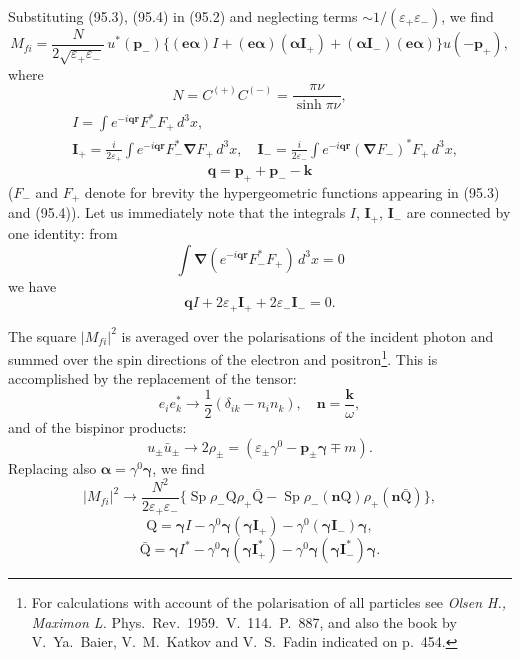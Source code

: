 Substituting (95.3), (95.4) in (95.2) and neglecting terms $\sim 1/(\varepsilon_+\varepsilon_-)$, we find
\begin{equation}
M_{fi} = \frac{N}{2\sqrt{\varepsilon_+\varepsilon_-}}\,u^*(\mathbf{p}_-)\{(\mathbf{e}\boldsymbol{\alpha})I + (\mathbf{e}\boldsymbol{\alpha})(\boldsymbol{\alpha}\mathbf{I}_+) + (\boldsymbol{\alpha}\mathbf{I}_-)(\mathbf{e}\boldsymbol{\alpha})\}u(-\mathbf{p}_+),
\label{eq:95.5}
\end{equation}
where
\begin{equation}
N = C^{(+)}C^{(-)} = \frac{\pi\nu}{\sinh\pi\nu},
\label{eq:95.6}
\end{equation}
\begin{equation}
\begin{split}
&I = \int e^{-i\mathbf{q}\mathbf{r}}F_-^* F_+\,d^3x, \\
&\mathbf{I}_+ = \frac{i}{2\varepsilon_+}\int e^{-i\mathbf{q}\mathbf{r}}F_-^*\boldsymbol{\nabla}F_+\,d^3x, \quad \mathbf{I}_- = \frac{i}{2\varepsilon_-}\int e^{-i\mathbf{q}\mathbf{r}}(\boldsymbol{\nabla}F_-)^*F_+\,d^3x,
\end{split}
\label{eq:95.7}
\end{equation}
\[
\mathbf{q} = \mathbf{p}_+ + \mathbf{p}_- - \mathbf{k}
\]
($F_-$ and $F_+$ denote for brevity the hypergeometric functions appearing in (95.3) and (95.4)). Let us immediately note that the integrals $I$, $\mathbf{I}_+$, $\mathbf{I}_-$ are connected by one identity: from
\[
\int\boldsymbol{\nabla}(e^{-i\mathbf{q}\mathbf{r}}F_-^*F_+)\,d^3x = 0
\]
we have
\begin{equation}
\mathbf{q}I + 2\varepsilon_+\mathbf{I}_+ + 2\varepsilon_-\mathbf{I}_- = 0.
\label{eq:95.8}
\end{equation}

The square $|M_{fi}|^2$ is averaged over the polarisations of the incident photon and summed over the spin directions of the electron and positron\footnote{For calculations with account of the polarisation of all particles see \emph{Olsen H., Maximon L.}\/\/ Phys.\ Rev.\ 1959.\ V.~114.\ P.~887, and also the book by V.~Ya.~Baier, V.~M.~Katkov and V.~S.~Fadin indicated on p.~454.}. This is accomplished by the replacement of the tensor:
\[
e_i e_k^* \to \frac{1}{2}(\delta_{ik} - n_i n_k), \quad \mathbf{n} = \frac{\mathbf{k}}{\omega},
\]
and of the bispinor products:
\[
u_\pm\bar{u}_\pm \to 2\rho_\pm = (\varepsilon_\pm\gamma^0 - \mathbf{p}_\pm\boldsymbol{\gamma} \mp m).
\]
Replacing also $\boldsymbol{\alpha} = \gamma^0\boldsymbol{\gamma}$, we find
\[
|M_{fi}|^2 \to \frac{N^2}{2\varepsilon_+\varepsilon_-}\{\operatorname{Sp}\rho_-\mathrm{Q}\rho_+\bar{\mathrm{Q}} - \operatorname{Sp}\rho_-(\mathbf{n}\mathrm{Q})\rho_+(\mathbf{n}\bar{\mathrm{Q}})\},
\]
\[
\mathrm{Q} = \boldsymbol{\gamma}I - \gamma^0\boldsymbol{\gamma}(\boldsymbol{\gamma}\mathbf{I}_+) - \gamma^0(\boldsymbol{\gamma}\mathbf{I}_-)\boldsymbol{\gamma},
\]
\[
\bar{\mathrm{Q}} = \boldsymbol{\gamma}I^* - \gamma^0\boldsymbol{\gamma}(\boldsymbol{\gamma}\mathbf{I}_+^*) - \gamma^0\boldsymbol{\gamma}(\boldsymbol{\gamma}\mathbf{I}_-^*)\boldsymbol{\gamma}.
\]

